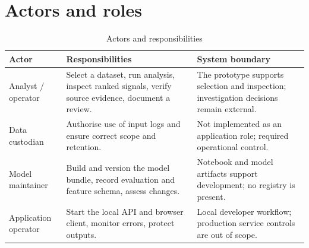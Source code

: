 \section{Actors and roles}
\begin{table}[H]
\centering
\tablefont
\caption{Actors and responsibilities}
\label{tab:actors}
\begin{tabularx}{\textwidth}{|p{}|p{}|Y|}
\hline
\textbf{Actor} & \textbf{Responsibilities} & \textbf{System boundary}\\\hline
Analyst / operator & Select a dataset, run analysis, inspect ranked signals, verify source evidence, document a review. & The prototype supports selection and inspection; investigation decisions remain external.\\\hline
Data custodian & Authorise use of input logs and ensure correct scope and retention. & Not implemented as an application role; required operational control.\\\hline
Model maintainer & Build and version the model bundle, record evaluation and feature schema, assess changes. & Notebook and model artifacts support development; no registry is present.\\\hline
Application operator & Start the local API and browser client, monitor errors, protect outputs. & Local developer workflow; production service controls are out of scope.\\\hline
\end{tabularx}
\end{table}

